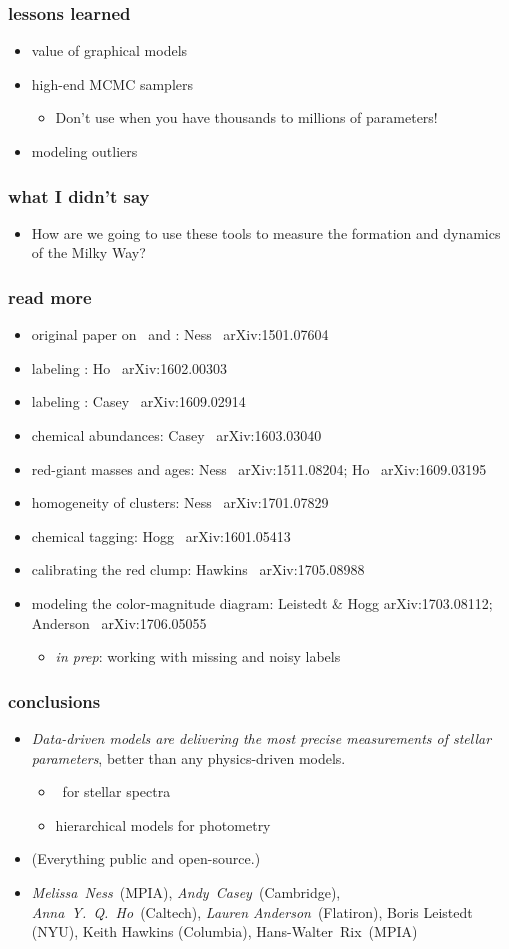 \documentclass[pdftex]{beamer}
\newcommand{\conclusions}{%
\begin{frame}
  \frametitle{conclusions}
  \begin{itemize}
  \item \emph{Data-driven models are delivering the most precise measurements
    of stellar parameters}, better than any physics-driven models.
    \begin{itemize}
    \item \tc\ for stellar spectra
    \item hierarchical models for photometry
    \end{itemize}
  \item (Everything public and open-source.)
  \item \emph{Melissa~Ness}~(MPIA), \emph{Andy~Casey}~(Cambridge), \emph{Anna~Y.~Q.~Ho}~(Caltech), \emph{Lauren Anderson}~(Flatiron), Boris Leistedt (NYU), Keith Hawkins (Columbia), Hans-Walter~Rix~(MPIA)
  \end{itemize}
\end{frame}}
\begin{document}
\begin{frame}
  \frametitle{lessons learned}
  \begin{itemize}
  \item value of graphical models
  \item high-end MCMC samplers
    \begin{itemize}
    \item Don't use  when you have thousands to millions of parameters!
    \end{itemize}
  \item modeling outliers
  \end{itemize}
\end{frame}

\begin{frame}
  \frametitle{what I didn't say}
  \begin{itemize}
  \item How are we going to use these tools to measure the formation
    and dynamics of the Milky Way?
  \end{itemize}
\end{frame}

\begin{frame}
  \frametitle{read more}
  \begin{itemize}
  \item original paper on \tc\ and \apogee: Ness \etal\ arXiv:1501.07604
  \item labeling \lamost: Ho \etal\ arXiv:1602.00303
  \item labeling : Casey \etal\ arXiv:1609.02914
  \item chemical abundances: Casey \etal\ arXiv:1603.03040
  \item red-giant masses and ages: Ness \etal\ arXiv:1511.08204; Ho \etal\ arXiv:1609.03195
  \item homogeneity of clusters: Ness \etal\ arXiv:1701.07829
  \item chemical tagging: Hogg \etal\ arXiv:1601.05413
  \item calibrating the red clump: Hawkins \etal\ arXiv:1705.08988
  \item modeling the color-magnitude diagram: Leistedt \& Hogg arXiv:1703.08112; Anderson \etal\ arXiv:1706.05055
    \begin{itemize}
    \item \textsl{in prep}: working with missing and noisy labels
    \end{itemize}
  \end{itemize}
\end{frame}

\conclusions
\end{document}
